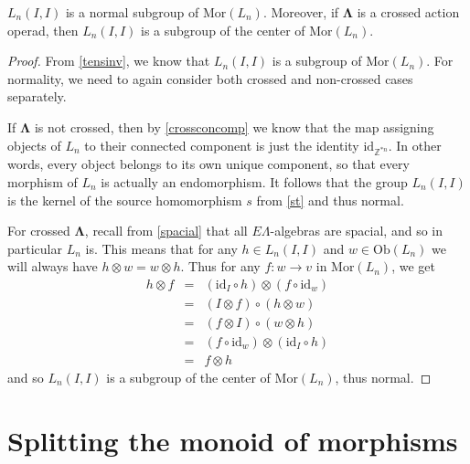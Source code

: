 \documentclass{amsbook} %
\newcommand{\id}{\textrm{id}}
\newcommand{\ML}{\mathbf{\Lambda}}
\newcommand{\MorLn}{\mathrm{Mor}(L_n)}
\numberwithin{section}{chapter}
\begin{document}
\begin{prop} \label{endnorm} $L_n(I,I)$ is a normal subgroup of $\MorLn$. Moreover, if $\ML$ is a crossed action operad, then $L_n(I,I)$ is a subgroup of the center of $\MorLn$.
\end{prop}
\begin{proof}
From \cref{tensinv}, we know that $L_n(I,I)$ is a subgroup of $\MorLn$. For normality, we need to again consider both crossed and non-crossed cases separately. 

If $\ML$ is not crossed, then by \cref{crossconcomp} we know that the map assigning objects of $L_n$ to their connected component is just the identity $\id_{\mathbb{Z}^{\ast n}}$. In other words, every object belongs to its own unique component, so that every morphism of $L_n$ is actually an endomorphism. It follows that the group $L_n(I,I)$ is the kernel of the source homomorphism $s$ from \cref{st} and thus normal.

For crossed $\ML$, recall from \cref{spacial} that all $E\Lambda$-algebras are spacial, and so in particular $L_n$ is. This means that for any $h \in L_n(I,I)$ and $w \in \mathrm{Ob}(L_n)$ we will always have $h \otimes w = w \otimes h$. Thus for any $f \colon w \to v$ in $\MorLn$, we get
\[ \begin{array}{rll}
		h \otimes f & = & (\id_I \circ h) \otimes (f \circ \id_w) \\
		& = & (I \otimes f) \circ (h \otimes w) \\
		& = & (f \otimes I) \circ (w \otimes h) \\
		& = & (f \circ \id_w) \otimes (\id_I \circ h) \\
		& = & f \otimes h
		\end{array}
\]
and so $L_n(I,I)$ is a subgroup of the center of $\MorLn$, thus normal. 
\end{proof}

\section{Splitting the monoid of morphisms}
\end{document}
